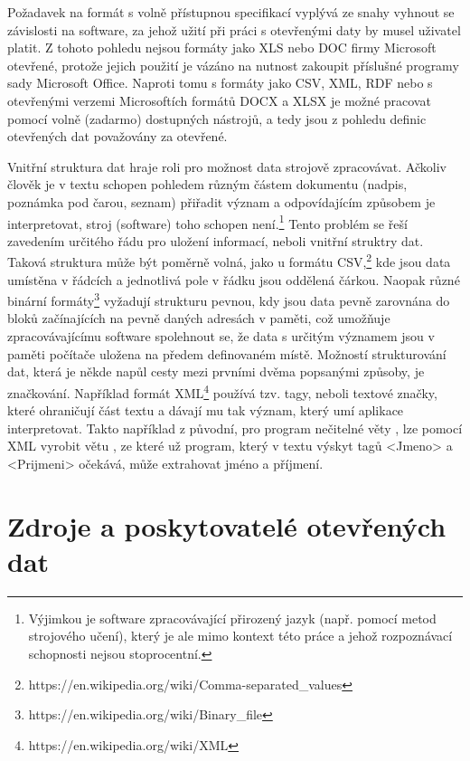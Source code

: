 Požadavek na formát s volně přístupnou specifikací vyplývá ze snahy vyhnout se závislosti na software, za jehož užití při práci s otevřenými daty by musel uživatel platit. Z tohoto pohledu nejsou formáty jako XLS nebo DOC firmy Microsoft otevřené, protože jejich použití je vázáno na nutnost zakoupit příslušné programy sady Microsoft Office. Naproti tomu s formáty jako CSV, XML, RDF nebo s otevřenými verzemi Microsoftích formátů DOCX a XLSX je možné pracovat pomocí volně (zadarmo) dostupných nástrojů, a tedy jsou z pohledu definic otevřených dat považovány za otevřené.

Vnitřní struktura dat hraje roli pro možnost data strojově zpracovávat. Ačkoliv člověk je v textu schopen pohledem různým částem dokumentu (nadpis, poznámka pod čarou, seznam) přiřadit význam a odpovídajícím způsobem je interpretovat, stroj (software) toho schopen není.\footnote{Výjimkou je software zpracovávající přirozený jazyk (např. pomocí metod strojového učení), který je ale mimo kontext této práce a jehož rozpoznávací schopnosti nejsou stoprocentní.} Tento problém se řeší zavedením určitého řádu pro uložení informací, neboli vnitřní struktry dat. Taková struktura může být poměrně volná, jako u formátu CSV,\footnote{https://en.wikipedia.org/wiki/Comma-separated\_values} kde jsou data umístěna v řádcích a jednotlivá pole v řádku jsou oddělená čárkou. Naopak různé binární formáty\footnote{https://en.wikipedia.org/wiki/Binary\_file} vyžadují strukturu pevnou, kdy jsou data pevně zarovnána do bloků začínajících na pevně daných adresách v paměti, což umožňuje zpracovávajícímu software spolehnout se, že data s určitým významem jsou v paměti počítače uložena na předem definovaném místě. Možností strukturování dat, která je někde napůl cesty mezi prvními dvěma popsanými způsoby, je značkování. Například formát XML\footnote{https://en.wikipedia.org/wiki/XML} používá tzv. tagy, neboli textové značky, které ohraničují část textu a dávají mu tak význam, který umí aplikace interpretovat. Takto například  z původní, pro program nečitelné věty \textit{}, lze pomocí XML vyrobit větu \textit{}, ze které už program, který v textu výskyt tagů \textsf{<Jmeno>} a \textsf{<Prijmeni>} očekává, může extrahovat jméno a příjmení.

\section{Zdroje a poskytovatelé otevřených dat}

